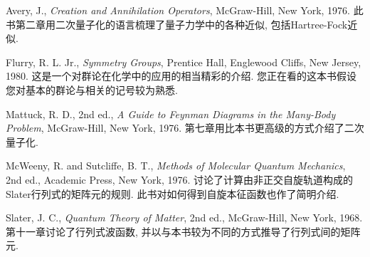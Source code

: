 \indent Avery, J., \textit{Creation and Annihilation Operators}, McGraw-Hill, New York, 1976. 此书第二章用二次量子化的语言梳理了量子力学中的各种近似, 包括Hartree-Fock近似.

Flurry, R. L. Jr., \textit{Symmetry Groups}, Prentice Hall, Englewood Cliffs, New Jersey, 1980. 这是一个对群论在化学中的应用的相当精彩的介绍. 您正在看的这本书假设您对基本的群论与相关的记号较为熟悉.

Mattuck, R. D., 2nd ed., \textit{A Guide to Feynman Diagrams in the Many-Body Problem}, McGraw-Hill, New York, 1976. 第七章用比本书更高级的方式介绍了二次量子化.

McWeeny, R. and Sutcliffe, B. T., \textit{Methods of Molecular Quantum Mechanics}, 2nd ed., Academic Press, New York, 1976. 讨论了计算由非正交自旋轨道构成的Slater行列式的矩阵元的规则. 此书对如何得到自旋本征函数也作了简明介绍.

Slater, J. C., \textit{Quantum Theory of Matter}, 2nd ed., McGraw-Hill, New York, 1968. 第十一章讨论了行列式波函数, 并以与本书较为不同的方式推导了行列式间的矩阵元.
